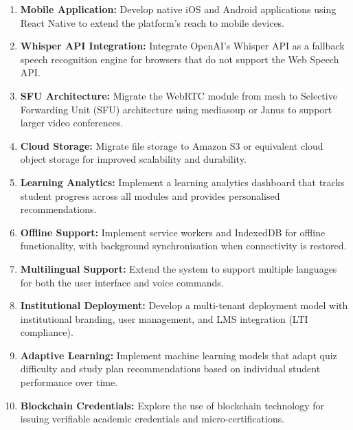 \documentclass[12pt,a4paper]{report}
\begin{document}
\begin{enumerate}
    \item \textbf{Mobile Application:} Develop native iOS and Android applications using React Native to extend the platform's reach to mobile devices.

    \item \textbf{Whisper API Integration:} Integrate OpenAI's Whisper API as a fallback speech recognition engine for browsers that do not support the Web Speech API.

    \item \textbf{SFU Architecture:} Migrate the WebRTC module from mesh to Selective Forwarding Unit (SFU) architecture using mediasoup or Janus to support larger video conferences.

    \item \textbf{Cloud Storage:} Migrate file storage to Amazon S3 or equivalent cloud object storage for improved scalability and durability.

    \item \textbf{Learning Analytics:} Implement a learning analytics dashboard that tracks student progress across all modules and provides personalised recommendations.

    \item \textbf{Offline Support:} Implement service workers and IndexedDB for offline functionality, with background synchronisation when connectivity is restored.

    \item \textbf{Multilingual Support:} Extend the system to support multiple languages for both the user interface and voice commands.

    \item \textbf{Institutional Deployment:} Develop a multi-tenant deployment model with institutional branding, user management, and LMS integration (LTI compliance).

    \item \textbf{Adaptive Learning:} Implement machine learning models that adapt quiz difficulty and study plan recommendations based on individual student performance over time.

    \item \textbf{Blockchain Credentials:} Explore the use of blockchain technology for issuing verifiable academic credentials and micro-certifications.
\end{enumerate}
\end{document}
